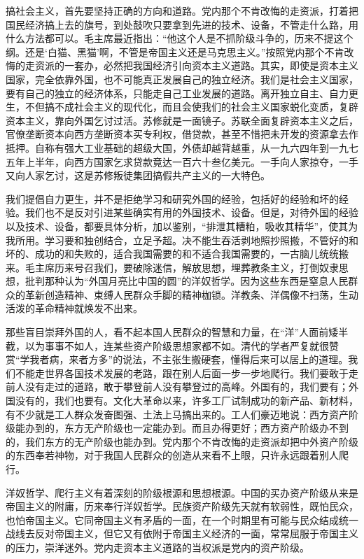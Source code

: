 \begin{maonote}
搞社会主义，首先要坚持正确的方向和道路。党内那个不肯改悔的走资派，打着把国民经济搞上去的旗号，到处鼓吹只要拿到先进的技术、设备，不管走什么路，用什么方法都可以。毛主席最近指出：“他这个人是不抓阶级斗争的，历来不提这个纲。还是‘白猫、黑猫’啊，不管是帝国主义还是马克思主义。”按照党内那个不肯改悔的走资派的一套办，必然把我国经济引向资本主义道路。其实，即使是资本主义国家，完全依靠外国，也不可能真正发展自己的独立经济。我们是社会主义国家，要有自己的独立的经济体系，只能走自己工业发展的道路。离开独立自主、自力更生，不但搞不成社会主义的现代化，而且会使我们的社会主义国家蜕化变质，复辟资本主义，靠向外国乞讨过活。苏修就是一面镜子。苏联全面复辟资本主义之后，官僚垄断资本向西方垄断资本买专利权，借贷款，甚至不惜把未开发的资源拿去作抵押。自称有强大工业基础的超级大国，外债却越背越重，从一九六四年到一九七五年上半年，向西方国家乞求贷款竟达一百六十叁亿美元。一手向人家掠夺，一手又向人家乞讨，这是苏修叛徒集团搞假共产主义的一大特色。

我们提倡自力更生，并不是拒绝学习和研究外国的经验，包括好的经验和坏的经验。我们也不是反对引进某些确实有用的外国技术、设备。但是，对待外国的经验以及技术、设备，都要具体分析，加以鉴别，“排泄其糟粕，吸收其精华”，使其为我所用。学习要和独创结合，立足予超。决不能生吞活剥地照抄照搬，不管好的和坏的、成功的和失败的，适合我国需要的和不适合我国需要的，一古脑儿统统搬来。毛主席历来号召我们，要破除迷信，解放思想，埋葬教条主义，打倒奴隶思想，批判那种认为“外国月亮比中国的圆”的洋奴哲学。因为这些东西是窒息人民群众的革新创造精神、束缚人民群众手脚的精神枷锁。洋教条、洋偶像不扫荡，生动活泼的革命精神就焕发不出来。

那些盲目崇拜外国的人，看不起本国人民群众的智慧和力量，在“洋”人面前矮半截，以为事事不如人，连某些资产阶级思想家都不如。清代的学者严复就很赞赏“学我者病，来者方多”的说法，不主张生搬硬套，懂得后来可以居上的道理。我们不能走世界各国技术发展的老路，跟在别人后面一步一步地爬行。我们要敢于走前人没有走过的道路，敢于攀登前人没有攀登过的高峰。外国有的，我们要有；外国没有的，我们也要有。文化大革命以来，许多工厂试制成功的新产品、新材料，有不少就是工人群众发奋图强、土法上马搞出来的。工人们豪迈地说：西方资产阶级能办到的，东方无产阶级也一定能办到。而且办得更好；西方资产阶级办不到的，我们东方的无产阶级也能办到。党内那个不肯改悔的走资派却把中外资产阶级的东西奉若神物，对于我国人民群众的创造从来看不上眼，只许永远跟着别人爬行。

洋奴哲学、爬行主义有着深刻的阶级根源和思想根源。中国的买办资产阶级从来是帝国主义的附庸，历来奉行洋奴哲学。民族资产阶级先天就有软弱性，既怕民众，也怕帝国主义。它同帝国主义有矛盾的一面，在一个时期里有可能与民众结成统一战线去反对帝国主义，但它又有依附于帝国主义经济的一面，常常屈服于帝国主义的压力，崇洋迷外。党内走资本主义道路的当权派是党内的资产阶级。


\end{maonote}
